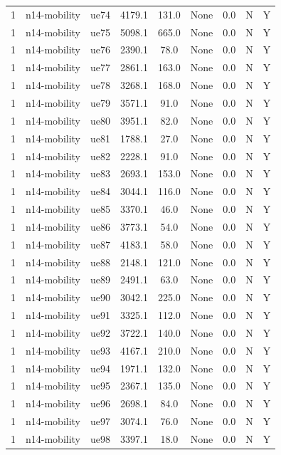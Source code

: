 \begin{table}[ht]
\begin{tabular}{|c|c|c|c|c|c|c|c|c|}
1 & n14-mobility & ue74 & 4179.1 & 131.0 & None & 0.0 & N & Y \\
1 & n14-mobility & ue75 & 5098.1 & 665.0 & None & 0.0 & N & Y \\
1 & n14-mobility & ue76 & 2390.1 & 78.0 & None & 0.0 & N & Y \\
1 & n14-mobility & ue77 & 2861.1 & 163.0 & None & 0.0 & N & Y \\
1 & n14-mobility & ue78 & 3268.1 & 168.0 & None & 0.0 & N & Y \\
1 & n14-mobility & ue79 & 3571.1 & 91.0 & None & 0.0 & N & Y \\
1 & n14-mobility & ue80 & 3951.1 & 82.0 & None & 0.0 & N & Y \\
1 & n14-mobility & ue81 & 1788.1 & 27.0 & None & 0.0 & N & Y \\
1 & n14-mobility & ue82 & 2228.1 & 91.0 & None & 0.0 & N & Y \\
1 & n14-mobility & ue83 & 2693.1 & 153.0 & None & 0.0 & N & Y \\
1 & n14-mobility & ue84 & 3044.1 & 116.0 & None & 0.0 & N & Y \\
1 & n14-mobility & ue85 & 3370.1 & 46.0 & None & 0.0 & N & Y \\
1 & n14-mobility & ue86 & 3773.1 & 54.0 & None & 0.0 & N & Y \\
1 & n14-mobility & ue87 & 4183.1 & 58.0 & None & 0.0 & N & Y \\
1 & n14-mobility & ue88 & 2148.1 & 121.0 & None & 0.0 & N & Y \\
1 & n14-mobility & ue89 & 2491.1 & 63.0 & None & 0.0 & N & Y \\
1 & n14-mobility & ue90 & 3042.1 & 225.0 & None & 0.0 & N & Y \\
1 & n14-mobility & ue91 & 3325.1 & 112.0 & None & 0.0 & N & Y \\
1 & n14-mobility & ue92 & 3722.1 & 140.0 & None & 0.0 & N & Y \\
1 & n14-mobility & ue93 & 4167.1 & 210.0 & None & 0.0 & N & Y \\
1 & n14-mobility & ue94 & 1971.1 & 132.0 & None & 0.0 & N & Y \\
1 & n14-mobility & ue95 & 2367.1 & 135.0 & None & 0.0 & N & Y \\
1 & n14-mobility & ue96 & 2698.1 & 84.0 & None & 0.0 & N & Y \\
1 & n14-mobility & ue97 & 3074.1 & 76.0 & None & 0.0 & N & Y \\
1 & n14-mobility & ue98 & 3397.1 & 18.0 & None & 0.0 & N & Y \\

\end{tabular}
\end{table}
